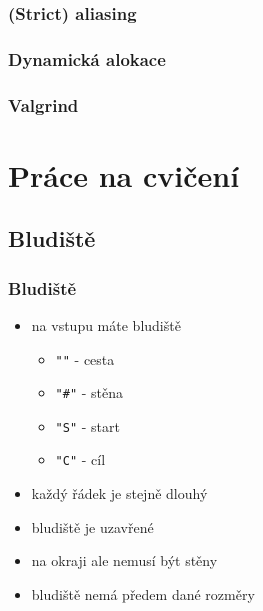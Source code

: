 \begin{frame}
	\frametitle{(Strict) aliasing}
\end{frame}

\begin{frame}
	\frametitle{Dynamická alokace}
\end{frame}

\begin{frame}
	\frametitle{Valgrind}
\end{frame}

\section{Práce na cvičení}
\subsection{Bludiště}

\begin{frame}
	\frametitle{Bludiště}
	\begin{itemize}
		\item{na vstupu máte bludiště}
		\begin{itemize}
			\item{\texttt{"\space"} - cesta}
			\item{\texttt{"\#"} - stěna}
			\item{\texttt{"S"} - start}
			\item{\texttt{"C"} - cíl}
		\end{itemize}
		\item{každý řádek je stejně dlouhý}
		\item{bludiště je uzavřené}
		\item{na okraji ale nemusí být stěny}
		\item{bludiště nemá předem dané rozměry}
	\end{itemize}
\end{frame}





